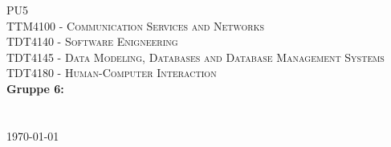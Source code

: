 \begin{titlepage}
\begin{center} 

\vspace*{3cm}
\textsc{\Huge PU5}\\[0.7cm]
\textsc{\medium TTM4100 - Communication Services and Networks}\\[0.3cm]
\textsc{\medium TDT4140 - Software Enigneering}\\[0.3cm]
\textsc{\medium TDT4145 - Data Modeling, Databases and Database Management Systems}\\[0.3cm]
\textsc{\medium TDT4180 - Human-Computer Interaction}\\[0.3cm]

\textbf{\Large Gruppe 6:} \\[0.2cm]
 \\
\\[1cm] 

\today

\end{center}
\end{titlepage}
